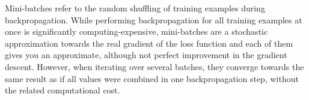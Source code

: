 Mini-batches refer to the random shuffling of training examples during backpropagation. While performing backpropagation for all training examples at once is significantly computing-expensive, mini-batches are a stochastic approximation towards the real gradient of the loss function and each of them gives you an approximate, although not perfect improvement in the gradient descent. However, when iterating over several batches, they converge towards the same result as if all values were combined in one backpropagation step, without the related computational cost. 
